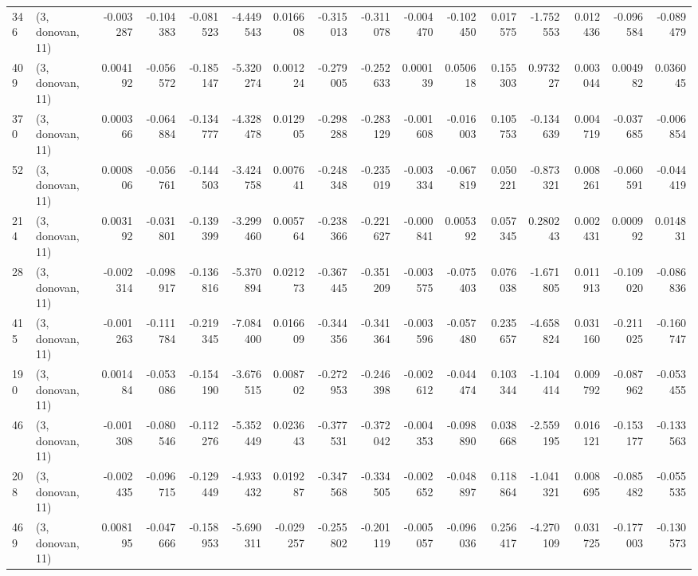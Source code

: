 \begin{tabular}{llrrrrrrrrrrrrrr}
346 &  (3, donovan, 11) &  -0.003287 & -0.104383 & -0.081523 &   -4.449543 &  0.016608 &  -0.315013 & -0.311078 & -0.004470 & -0.102450 &  0.017575 &   -1.752553 &  0.012436 & -0.096584 & -0.089479 \\
409 &  (3, donovan, 11) &   0.004192 & -0.056572 & -0.185147 &   -5.320274 &  0.001224 &  -0.279005 & -0.252633 &  0.000139 &  0.050618 &  0.155303 &    0.973227 &  0.003044 &  0.004982 &  0.036045 \\
370 &  (3, donovan, 11) &   0.000366 & -0.064884 & -0.134777 &   -4.328478 &  0.012905 &  -0.298288 & -0.283129 & -0.001608 & -0.016003 &  0.105753 &   -0.134639 &  0.004719 & -0.037685 & -0.006854 \\
52  &  (3, donovan, 11) &   0.000806 & -0.056761 & -0.144503 &   -3.424758 &  0.007641 &  -0.248348 & -0.235019 & -0.003334 & -0.067819 &  0.050221 &   -0.873321 &  0.008261 & -0.060591 & -0.044419 \\
214 &  (3, donovan, 11) &   0.003192 & -0.031801 & -0.139399 &   -3.299460 &  0.005764 &  -0.238366 & -0.221627 & -0.000841 &  0.005392 &  0.057345 &    0.280243 &  0.002431 &  0.000992 &  0.014831 \\
28  &  (3, donovan, 11) &  -0.002314 & -0.098917 & -0.136816 &   -5.370894 &  0.021273 &  -0.367445 & -0.351209 & -0.003575 & -0.075403 &  0.076038 &   -1.671805 &  0.011913 & -0.109020 & -0.086836 \\
415 &  (3, donovan, 11) &  -0.001263 & -0.111784 & -0.219345 &   -7.084400 &  0.016609 &  -0.344356 & -0.341364 & -0.003596 & -0.057480 &  0.235657 &   -4.658824 &  0.031160 & -0.211025 & -0.160747 \\
190 &  (3, donovan, 11) &   0.001484 & -0.053086 & -0.154190 &   -3.676515 &  0.008702 &  -0.272953 & -0.246398 & -0.002612 & -0.044474 &  0.103344 &   -1.104414 &  0.009792 & -0.087962 & -0.053455 \\
46  &  (3, donovan, 11) &  -0.001308 & -0.080546 & -0.112276 &   -5.352449 &  0.023643 &  -0.377531 & -0.372042 & -0.004353 & -0.098890 &  0.038668 &   -2.559195 &  0.016121 & -0.153177 & -0.133563 \\
208 &  (3, donovan, 11) &  -0.002435 & -0.096715 & -0.129449 &   -4.933432 &  0.019287 &  -0.347568 & -0.334505 & -0.002652 & -0.048897 &  0.118864 &   -1.041321 &  0.008695 & -0.085482 & -0.055535 \\
469 &  (3, donovan, 11) &   0.008195 & -0.047666 & -0.158953 &   -5.690311 & -0.029257 &  -0.255802 & -0.201119 & -0.005057 & -0.096036 &  0.256417 &   -4.270109 &  0.031725 & -0.177003 & -0.130573 \\

\end{tabular}
